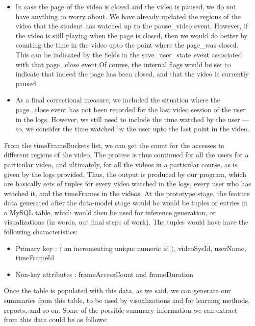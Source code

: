 \documentclass[16pt]{report}
\begin{document}
\begin{itemize}
\item In case the page of the video is closed and the video is paused, we do not have anything to worry about. We have already updated the regions of the video that the student has watched up to the pause\_video event. However, if the video is still playing when the page is closed, then we would do better by counting the time in the video upto the point where the page\_was closed. This can be indicated by the fields in the save\_user\_state event associated with that page\_close event.Of course, the internal flags would be set to indicate that indeed the page has been closed, and that the video is currently paused

\item As a final correctional measure, we included the situation where the page\_close event has not been recorded for the last video session of the user in the logs. However, we still need to include the time watched by the user --- so, we consider the time watched by the user upto the last point in the video.

\end{itemize}

From the timeFrameBuckets list, we can get the count for the accesses to different regions of the video. The process is thus continued for all the users for a particular video, and ultimately, for all the videos in a particular course, as is given by the logs provided. Thus, the output is produced by our program, which are basically sets of tuples for every video watched in the logs, every user who has watched it, and the timeFrames in the videos. At the prototype stage, the feature data generated after the data-model stage would be would be tuples or entries in a MySQL table, which would then be used for inference generation, or visualizations (in words, out final steps of work). The tuples would have have the following characteristics:

\begin{itemize}

\item Primary key : $\langle$ an incrementing unique numeric id $\rangle$, videoSysId, userName, timeFrameId
\item Non-key attributes : frameAccessCount and frameDuration

\end{itemize}

Once the table is populated with this data, as we said, we can generate our summaries from this table, to be used by visualizations and for learning methods, reports, and so on. Some of the possible summary information we can extract from this data could be as follows:
\end{document}
